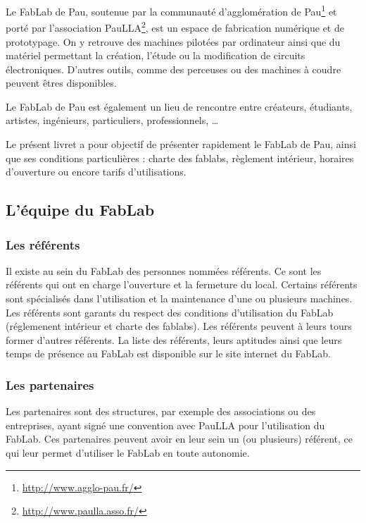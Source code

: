 Le FabLab de Pau, soutenue par la communauté d'agglomération de Pau\footnote{\url{http://www.agglo-pau.fr/}} et porté par l'association PauLLA\footnote{\url{http://www.paulla.asso.fr/}}, est un espace de fabrication numérique et de prototypage. On y retrouve des machines pilotées par ordinateur ainsi que du matériel permettant la création, l'étude  ou la modification de circuits électroniques. D'autres outils, comme des perceuses ou des machines à coudre peuvent êtres disponibles.

Le FabLab de Pau est également un lieu de rencontre entre créateurs, étudiants, artistes, ingénieurs, particuliers, professionnels, \dots 

Le présent livret a pour objectif de présenter rapidement le FabLab de Pau, ainsi que ses conditions particulières : charte des fablabs, règlement intérieur, horaires d'ouverture ou encore tarifs d'utilisations.


\subsection{L'équipe du FabLab}
\subsubsection{Les référents}
Il existe au sein du FabLab des personnes nommées référents.
Ce sont les référents qui ont en charge l'ouverture et la fermeture du local.
Certains référents sont spécialisés dans l'utilisation et la maintenance d'une ou plusieurs machines.
Les référents sont garants du respect des conditions d'utilisation du FabLab (réglemenent intérieur et charte des fablabs).
Les référents peuvent à leurs tours former d'autres référents.
La liste des référents, leurs aptitudes ainsi que leurs temps de présence au FabLab est disponible sur le site internet du FabLab. %

\subsubsection{Les partenaires}
Les partenaires sont des structures, par exemple des associations ou des entreprises, ayant signé une convention avec PauLLA pour l'utilisation du FabLab.
Ces partenaires peuvent avoir en leur sein un (ou plusieurs) référent, ce qui leur permet d'utiliser le FabLab en toute autonomie.

